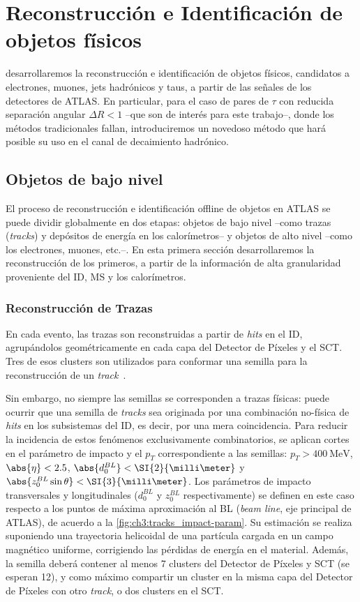 \chapter{Reconstrucción e Identificación de objetos físicos} \label{chap:ch3}

 desarrollaremos la reconstrucción e identificación de objetos físicos, candidatos a electrones, muones, jets hadrónicos y taus, a partir de las señales de los detectores de ATLAS. En particular, para el caso de pares de $\tau$ con reducida separación angular $\Delta R < 1$ --que son de interés para este trabajo--, donde los métodos tradicionales fallan, introduciremos un novedoso método que hará posible su uso en el canal de decaimiento hadrónico.

\section{Objetos de bajo nivel}

El proceso de reconstrucción e identificación offline de objetos en ATLAS se puede dividir globalmente en dos etapas: objetos de bajo nivel --como trazas (\textit{tracks}) y depósitos de energía en los calorímetros-- y objetos de alto nivel --como los electrones, muones, etc.--. En esta primera sección desarrollaremos la reconstrucción de los primeros, a partir de la información de alta granularidad proveniente del ID, MS y los calorímetros.

\subsection{Reconstrucción de Trazas}

En cada evento, las trazas son reconstruidas a partir de \textit{hits} en el ID, agrupándolos geométricamente en cada capa del Detector de Píxeles y el SCT. Tres de esos clusters son utilizados para conformar una semilla para la reconstrucción de un \textit{track}~\cite{Cornelissen2008a,Cornelissen2008,TheATLASCollaboration2017}.

Sin embargo, no siempre las semillas se corresponden a trazas físicas: puede ocurrir que una semilla de \textit{tracks} sea originada por una combinación no-física de \textit{hits} en los subsistemas del ID, es decir, por una mera coincidencia. Para reducir la incidencia de estos fenómenos exclusivamente combinatorios, se aplican cortes en el parámetro de impacto y el $p_T$ correspondiente a las semillas: $p_T > \SI{400}{\MeV}$, $\abs{\eta} < 2.5$, $\abs{d_0^{BL}} < \SI{2}{\milli\meter}$ y $\abs{z_0^{BL} \sin\theta} < \SI{3}{\milli\meter}$. Los parámetros de impacto transversales y longitudinales ($d_0^{BL}$ y $z_0^{BL}$ respectivamente) se definen en este caso respecto a los puntos de máxima aproximación al BL (\textit{beam line}, eje principal de ATLAS), de acuerdo a la \cref{fig:ch3:tracks_impact-param}. Su estimación se realiza suponiendo una trayectoria helicoidal de una partícula cargada en un campo magnético uniforme, corrigiendo las pérdidas de energía en el material. Además, la semilla deberá contener al menos 7 clusters del Detector de Píxeles y SCT (se esperan 12), y como máximo compartir un cluster en la misma capa del Detector de Píxeles con otro \textit{track}, o dos clusters en el SCT.



